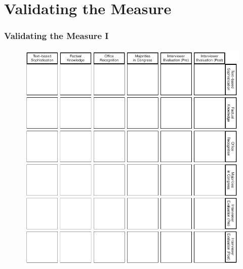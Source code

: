 \documentclass{beamer}
\begin{document}


\section{Validating the Measure}

\begin{frame} %
\frametitle{Validating the Measure I}
  \begin{figure}
  \includegraphics[height = .9\textheight]{../fig/corplot_empty.pdf}
  \end{figure}
\end{frame}
\end{document}
